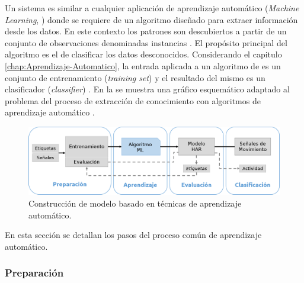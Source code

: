 \label{sec45:clasificador}Un sistema  es similar a cualquier
aplicación de aprendizaje automático (\emph{Machine Learning}, )
donde se requiere de un algoritmo diseñado para extraer información
desde los datos. En este contexto los patrones son descubiertos a
partir de un conjunto de observaciones denominadas instancias \cite{LaraLabrador2013}.
El propósito principal del algoritmo es el de clasificar los datos
desconocidos. Considerando el capitulo \ref{chap:Aprendizaje-Automatico},
la entrada aplicada a un algoritmo de  es un conjunto de
entrenamiento (\emph{training set}) y el resultado del mismo es un
clasificador (\emph{classifier}) \cite{Rajaraman2011}. En la 
se muestra una gráfico esquemático adaptado al problema 
del proceso de extracción de conocimiento con algoritmos de aprendizaje
automático \cite{Raschka2014}.

\begin{figure}[H]
\begin{centering}
\includegraphics[width=1\columnwidth]{capitulo-4/graphics/clasificacion}
\par\end{centering}
\caption[Modelo de aprendizaje automático]{\label{fig4:clasificador}Construcción de modelo  basado
en técnicas de aprendizaje automático.}
\end{figure}

En esta sección se detallan los pasos del proceso común de aprendizaje
automático.

\subsubsection{Preparación}


